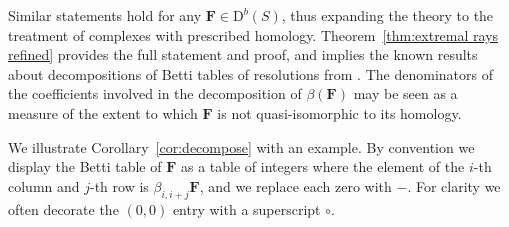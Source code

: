 \documentclass[12pt]{amsart}
\theoremstyle{definition}
\theoremstyle{remark}
\newcommand{\FF}{\mathbf{F}}
\newcommand{\DD}{\mathrm{D}}
\begin{document}
Similar statements hold for any $\FF\in \DD^b(S)$, thus expanding the theory to the treatment of complexes with prescribed homology.  Theorem~\ref{thm:extremal rays refined} provides the full statement and proof, and implies the known results about decompositions of Betti tables
of resolutions from \cites{eis-schrey1,boij-sod2}.  The denominators of the coefficients involved in the decomposition of $\beta(\FF)$ may be seen as a measure of the extent to which $\FF$ is not quasi-isomorphic to its homology. 

We illustrate Corollary~\ref{cor:decompose} with an example.  By convention we display the Betti table of $\FF$ as a table
of integers where the element of the $i$-th column and $j$-th row is $\beta_{i,i+j}\FF$, and we replace each zero with $-$. For clarity we often decorate the $(0,0)$ entry
with a superscript $\circ$.
\end{document}
